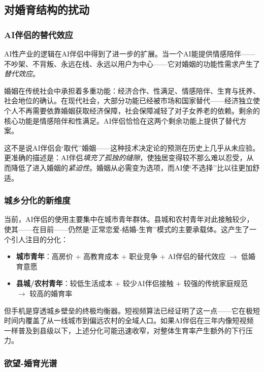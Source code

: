 \documentclass[12pt,a4paper]{ctexart}
\begin{document}
\subsection{对婚育结构的扰动}

\subsubsection{AI伴侣的替代效应}

AI性产业的逻辑在AI伴侣中得到了进一步的扩展。当一个AI能提供情感陪伴——不吵架、不背叛、永远在线、永远以用户为中心——它对婚姻的功能性需求产生了\emph{替代效应}。

婚姻在传统社会中承担着多重功能：经济合作、性满足、情感陪伴、生育与抚养、社会地位的确认。在现代社会，大部分功能已经被市场和国家替代——经济独立使个人不再需要依靠婚姻获取经济保障，社会保障减轻了对子女养老的依赖。剩余的核心功能是情感陪伴和性满足。AI伴侣恰恰在这两个剩余功能上提供了替代方案。

这不是说AI伴侣会`取代''婚姻——这种技术决定论的预测在历史上几乎从未应验。更准确的描述是：AI伴侣\textit{填充了孤独的缝隙}，使独居变得较不那么难以忍受，从而降低了进入婚姻的\textit{紧迫性}。婚姻从必需变为选项，而AI使`不选择''比以往更加舒适。

\subsubsection{城乡分化的新维度}

当前，AI伴侣的使用主要集中在城市青年群体。县城和农村青年对此接触较少，使其——在目前——仍然是`正常恋爱-结婚-生育''模式的主要承载体。这产生了一个引人注目的分化：

\begin{itemize}
\item \textbf{城市青年}：高房价 + 高教育成本 + 职业竞争 + AI伴侣的替代效应 $\rightarrow$ 低婚育意愿
\item \textbf{县城/农村青年}：较低生活成本 + 较少AI伴侣接触 + 较强的传统家庭规范 $\rightarrow$ 较高的婚育率
\end{itemize}

但手机是穿透城乡壁垒的终极均衡器。短视频算法已经证明了这一点——它在极短时间内覆盖了从一线城市到偏远农村的全域人口。如果AI伴侣在三年内像短视频一样普及到县级以下，上述分化可能迅速收窄，对整体生育率产生额外的下行压力。

\subsubsection{欲望-婚育光谱}
\end{document}
